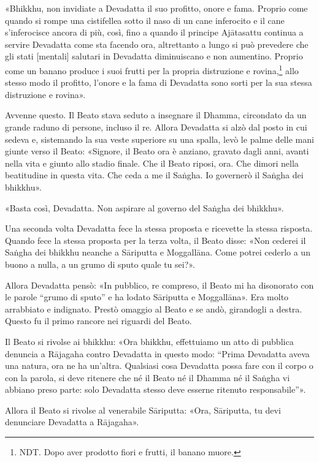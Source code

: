 «Bhikkhu, non invidiate a Devadatta il suo profitto, onore e fama.
Proprio come quando si rompe una cistifellea sotto il naso di un cane
inferocito e il cane s’inferocisce ancora di più, così, fino a quando il
principe Ajātasattu continua a servire Devadatta come sta facendo ora,
altrettanto a lungo si può prevedere che gli stati [mentali] salutari in
Devadatta diminuiscano e non aumentino. Proprio come un banano produce i
suoi frutti per la propria distruzione e rovina,\footnote{NDT. Dopo aver prodotto fiori e frutti, il banano muore.} allo
stesso modo il profitto, l’onore e la fama di Devadatta sono sorti per
la sua stessa distruzione e rovina».




Avvenne questo. Il Beato stava seduto a insegnare il Dhamma, circondato
da un grande raduno di persone, incluso il re. Allora Devadatta si alzò
dal posto in cui sedeva e, sistemando la sua veste superiore su una
spalla, levò le palme delle mani giunte verso il Beato: «Signore, il
Beato ora è anziano, gravato dagli anni, avanti nella vita e giunto allo
stadio finale. Che il Beato riposi, ora. Che dimori nella beatitudine in
questa vita. Che ceda a me il Saṅgha. Io governerò il Saṅgha dei
bhikkhu».


«Basta così, Devadatta. Non aspirare al governo del Saṅgha dei bhikkhu».


Una seconda volta Devadatta fece la stessa proposta e ricevette la
stessa risposta. Quando fece la stessa proposta per la terza volta, il
Beato disse: «Non cederei il Saṅgha dei bhikkhu neanche a Sāriputta e
Moggallāna. Come potrei cederlo a un buono a nulla, a un grumo di sputo
quale tu sei?».


Allora Devadatta pensò: «In pubblico, re compreso, il Beato mi ha
disonorato con le parole “grumo di sputo” e ha lodato Sāriputta e
Moggallāna». Era molto arrabbiato e indignato. Prestò omaggio al Beato e
se andò, girandogli a destra. Questo fu il primo rancore nei riguardi
del Beato.


Il Beato si rivolse ai bhikkhu: «Ora bhikkhu, effettuiamo un atto di
pubblica denuncia a Rājagaha contro Devadatta in questo modo: “Prima
Devadatta aveva una natura, ora ne ha un’altra. Qualsiasi cosa Devadatta
possa fare con il corpo o con la parola, si deve ritenere che né il
Beato né il Dhamma né il Saṅgha vi abbiano preso parte: solo Devadatta
stesso deve esserne ritenuto responsabile”».


Allora il Beato si rivolse al venerabile Sāriputta: «Ora, Sāriputta, tu
devi denunciare Devadatta a Rājagaha».


